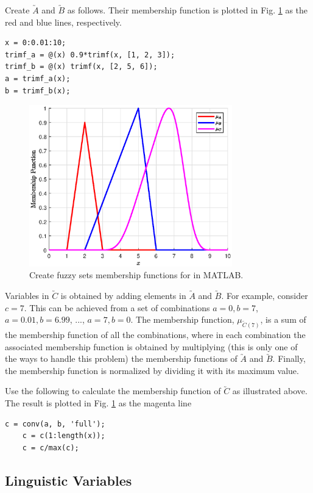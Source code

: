 Create $\utilde{A}$ and $\utilde{B}$ as follows. Their membership function is plotted in Fig. \ref{ch:fcs:fig:exp_createfuzzyset} as the red and blue lines, respectively.
\begin{lstlisting}[style=Matlab-editor]
x = 0:0.01:10;
trimf_a = @(x) 0.9*trimf(x, [1, 2, 3]);
trimf_b = @(x) trimf(x, [2, 5, 6]);
a = trimf_a(x);
b = trimf_b(x);
\end{lstlisting}

\begin{figure}
	\centering
	\includegraphics[width=250pt]{chapters/ch-fuzzy-control-system/figures/exp_createfuzzyset.eps}
	\caption{Create fuzzy sets membership functions for in MATLAB.}
	\label{ch:fcs:fig:exp_createfuzzyset}
\end{figure}

Variables in $\utilde{C}$ is obtained by adding elements in $\utilde{A}$ and $\utilde{B}$. For example, consider $c = 7$. This can be achieved from a set of combinations $a=0, b=7$, $a=0.01, b=6.99$, ..., $a = 7, b = 0$. The membership function, $\mu_{\utilde{C}(7)}$, is a sum of the membership function of all the combinations, where in each combination the associated membership function is obtained by multiplying (this is only one of the ways to handle this problem) the membership functions of $\utilde{A}$ and $\utilde{B}$. Finally, the membership function is normalized by dividing it with its maximum value.

Use the following to calculate the membership function of $\utilde{C}$ as illustrated above. The result is plotted in Fig. \ref{ch:fcs:fig:exp_createfuzzyset} as the magenta line
\begin{lstlisting}[style=Matlab-editor]
	c = conv(a, b, 'full');
	c = c(1:length(x));
	c = c/max(c);
\end{lstlisting}

\subsection{Linguistic Variables}

